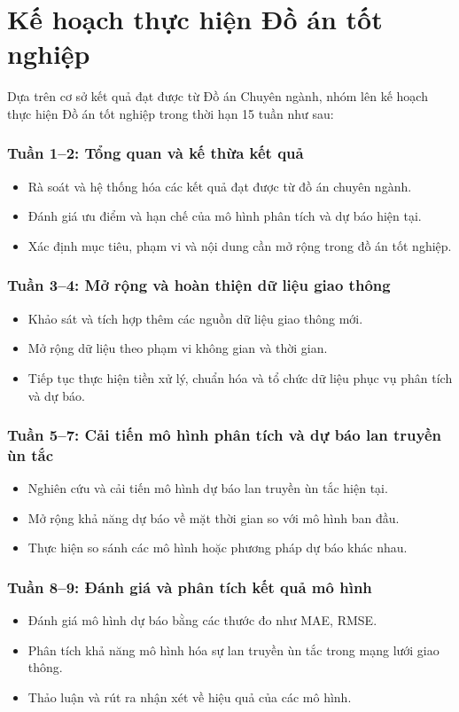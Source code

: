 \section*{Kế hoạch thực hiện Đồ án tốt nghiệp}
Dựa trên cơ sở kết quả đạt được từ Đồ án Chuyên ngành, nhóm lên kế hoạch thực hiện Đồ án tốt nghiệp trong thời hạn 15 tuần như sau:

\subsubsection*{Tuần 1--2: Tổng quan và kế thừa kết quả}
\begin{itemize}
    \item Rà soát và hệ thống hóa các kết quả đạt được từ đồ án chuyên ngành.
    \item Đánh giá ưu điểm và hạn chế của mô hình phân tích và dự báo hiện tại.
    \item Xác định mục tiêu, phạm vi và nội dung cần mở rộng trong đồ án tốt nghiệp.
\end{itemize}

\subsubsection*{Tuần 3--4: Mở rộng và hoàn thiện dữ liệu giao thông}
\begin{itemize}
    \item Khảo sát và tích hợp thêm các nguồn dữ liệu giao thông mới.
    \item Mở rộng dữ liệu theo phạm vi không gian và thời gian.
    \item Tiếp tục thực hiện tiền xử lý, chuẩn hóa và tổ chức dữ liệu phục vụ phân tích và dự báo.
\end{itemize}

\subsubsection*{Tuần 5--7: Cải tiến mô hình phân tích và dự báo lan truyền ùn tắc}
\begin{itemize}
    \item Nghiên cứu và cải tiến mô hình dự báo lan truyền ùn tắc hiện tại.
    \item Mở rộng khả năng dự báo về mặt thời gian so với mô hình ban đầu.
    \item Thực hiện so sánh các mô hình hoặc phương pháp dự báo khác nhau.
\end{itemize}

\subsubsection*{Tuần 8--9: Đánh giá và phân tích kết quả mô hình}
\begin{itemize}
    \item Đánh giá mô hình dự báo bằng các thước đo như MAE, RMSE.
    \item Phân tích khả năng mô hình hóa sự lan truyền ùn tắc trong mạng lưới giao thông.
    \item Thảo luận và rút ra nhận xét về hiệu quả của các mô hình.
\end{itemize}

